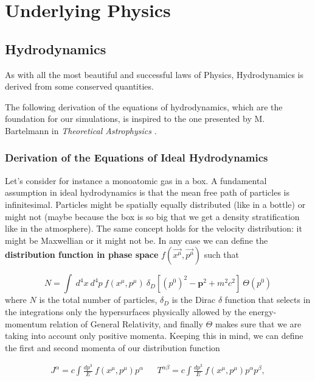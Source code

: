 
\chapter{Underlying Physics}
\section{Hydrodynamics}
As with all the most beautiful and successful laws of Physics, Hydrodynamics is derived from some conserved quantities. 

The following derivation of the equations of hydrodynamics, which are the foundation for our simulations, is inspired to the one presented by M. Bartelmann in \textit{Theoretical Astrophysics} \cite{theoastro}. 
\subsection{Derivation of the Equations of Ideal Hydrodynamics}

Let's consider for instance a monoatomic gas in a box. A fundamental assumption in ideal hydrodynamics is that the mean free path of particles is infinitesimal. Particles might be spatially equally distributed (like in a bottle) or might not (maybe because the box is so big that we get a density stratification like in the atmosphere). The same concept holds for the velocity distribution: it might be Maxwellian or it might not be. 
In any case we can define the \textbf{distribution function in phase space} $f( \vec{x^{\mu}}, \vec{p^{\mu}})$ such that

$$N=\int \ d^4x \ d^4p \ f( x^{\mu}, p^{\mu}) \  \delta_D[(p^0)^2-\mathbf{p}^2+m^2c^2] \  \Theta(p^0)$$ 
 where $N$ is the total number of particles, $\delta_D$ is the Dirac $\delta$ function that selects in the integrations only the hypersurfaces physically allowed by the energy-momentum relation of General Relativity, and finally $\Theta$ makes sure that we are taking into account only positive momenta. 
Keeping this in mind, we can define the first and second momenta of our distribution function

\begin{align}
J^{\alpha}= c \int \frac{dp^3}{E} \ f( x^{\mu}, p^{\mu}) p^{\alpha}  &&   T^{\alpha \beta}= c \int \frac{dp^3}{E} \ f( x^{\mu}, p^{\mu}) p^{\alpha}p^{\beta}, 
\end{align}
 
